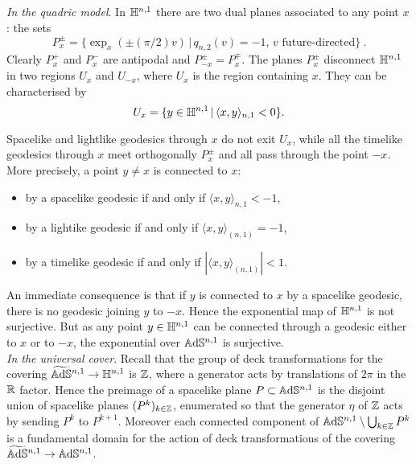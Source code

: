 \noindent\textit{In the quadric model}. In $\mathbb{H}^{n,1}$ there are two dual planes associated to any point $x$: the sets 
\[
P_{x}^\pm=\{\exp_{x}(\pm(\pi/2)v)\,|\,q_{n,2}(v)=-1,\,v\text{ future-directed}\}~.
\]
Clearly $P_{x}^+$ and $P_{x}^{-} $ are antipodal and  $P_{-x}^\pm=P_{x}^\mp$. The planes $P_x^{\pm}$ disconnect $\mathbb{H}^{n,1}$ in two regions $U_x$ and
$U_{-x}$, where $U_{x}$ is the region containing $x$. They can be characterised by 
\[
U_{x}=\{y\in\mathbb{H}^{n,1}\,|\,\langle x, y\rangle_{n,1}<0\}.
\]

Spacelike and lightlike geodesics through $x$ do not exit $U_{x}$, 
while all the timelike geodesics through $x$ meet orthogonally $P^{\pm}_x$ and all pass through the point $-x$.
More precisely, a point $y\neq x$ is connected to $x$:
\begin{itemize}
\item by a spacelike geodesic if and only if $\langle x,y\rangle_{n,1}<-1$,
\item by a lightike geodesic if and only if $\langle x,y\rangle_{(n,1)}=-1$,
\item by a timelike geodesic if and only if 
$|\langle x,y\rangle_{(n,1)}|<1$.
\end{itemize}
An immediate consequence is that if $y$ is connected to $x$ by a spacelike geodesic, there is no geodesic joining $y$ to $-x$.
Hence the exponential map of $\mathbb{H}^{n,1}$ is not surjective. But as any point $y\in\mathbb{H}^{n,1}$ can be connected through a geodesic either to $x$ or to $-x$,
the exponential over $\mathbb{A}\mathrm{d}\mathbb{S}^{n,1}$ is surjective.\\

\noindent\textit{In the universal cover}.
Recall that the group of deck transformations for the covering $\widetilde{\mathbb{A}\mathrm{d}\mathbb{S}}{}^{n,1} \to \mathbb{H}^{n,1}$ is $\mathbb{Z}$, where a generator acts by translations of $2\pi$ in the $\mathbb{R}$ factor. Hence the  preimage of a spacelike plane $P\subset\mathbb{A}\mathrm{d}\mathbb{S}^{n,1}$ is the disjoint union of spacelike planes $(P^k)_{k\in\mathbb{Z}}$, enumerated so that the generator $\eta$ of $\mathbb{Z}$ acts by sending $P^k$ to $P^{k+1}$.
Moreover each connected component of $\mathbb{A}\mathrm{d}\mathbb{S}^{n,1}\setminus\bigcup_{k\in\mathbb{Z}}P^k$ is a fundamental  domain for the action of deck transformations of the covering $\widetilde{\mathbb{A}\mathrm{d}\mathbb{S}}{}^{n,1}\to\mathbb{A}\mathrm{d}\mathbb{S}^{n,1}$.